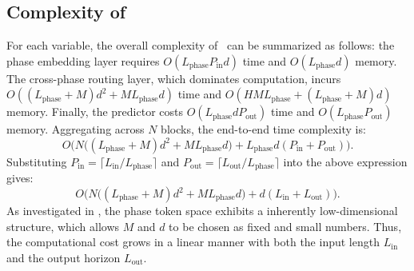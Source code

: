 \subsection{Complexity of \sysname}

For each variable, the overall complexity of \sysname\ can be summarized as follows:  
the phase embedding layer requires $O(L_{\text{phase}} P_{\text{in}} d)$ time and $O(L_{\text{phase}} d)$ memory.  
The cross-phase routing layer, which dominates computation, incurs $O((L_{\text{phase}}+M)d^2 + M L_{\text{phase}} d)$ time and $O(H M L_{\text{phase}} + (L_{\text{phase}}+M)d)$ memory.  
Finally, the predictor costs $O(L_{\text{phase}} d P_{\text{out}})$ time and $O(L_{\text{phase}} P_{\text{out}})$ memory.  
Aggregating across \(N\) blocks, the end-to-end time complexity is:
\[
O\Big(N\big((L_{\text{phase}}+M)d^2 + M L_{\text{phase}} d\big)
+ L_{\text{phase}}d(P_{\text{in}}+P_{\text{out}})\Big).
\]
Substituting $P_{\text{in}}=\lceil L_{\text{in}}/L_{\text{phase}}\rceil$ and 
$P_{\text{out}}=\lceil L_{\text{out}}/L_{\text{phase}}\rceil$ into the above expression gives:
\[
O\Big(N\big((L_{\text{phase}}+M)d^2 + M L_{\text{phase}} d\big)
+ d(L_{\text{in}}+L_{\text{out}})\Big).
\]
As investigated in , the phase token space exhibits a inherently low-dimensional structure, which allows $M$ and $d$ to be chosen as fixed and small numbers. 
Thus, the computational cost grows in a linear manner with both the input length $L_{\text{in}}$ and the output horizon $L_{\text{out}}$.

